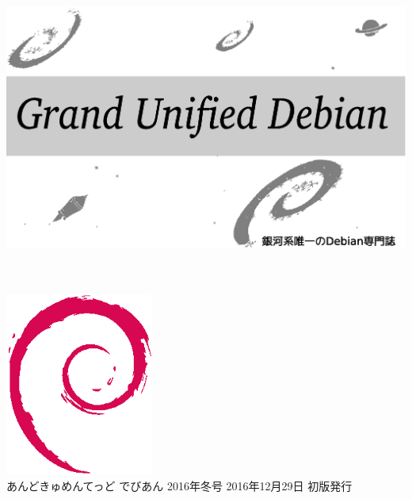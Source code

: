 \documentclass[mingoth,a4paper]{jsarticle}
\begin{document}
\begin{titlepage}
\thispagestyle{empty}

\hspace*{-2.5cm}
\includegraphics{image2012-natsu/gudeb.eps}\\
\\
\\

\hspace*{11cm}\includegraphics[height=6cm]{image200502/openlogo-nd.eps}\\
\vspace*{0.1cm}
\hfill あんどきゅめんてっど でびあん 2016年冬号 2016年12月29日 初版発行
\end{titlepage}

\newpage
\thispagestyle{empty}\mbox{}
\newpage
\end{document}
